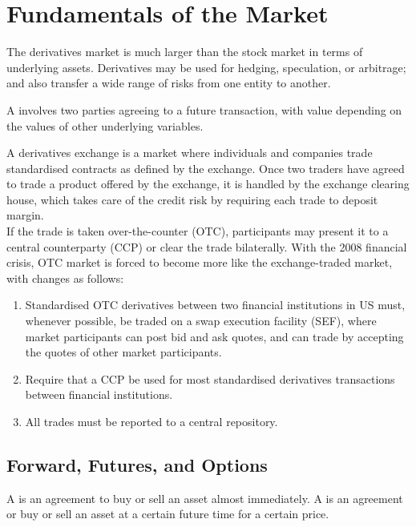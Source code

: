 \section{Fundamentals of the Market}

The derivatives market is much larger than the stock market in terms of underlying assets. Derivatives may be used for hedging, speculation, or arbitrage; and also transfer a wide range of risks from one entity to another.

\begin{definition} A  involves two parties agreeing to a future transaction, with value depending on the values of other underlying variables.
\end{definition}

A derivatives exchange is a market where individuals and companies trade standardised contracts as defined by the exchange. Once two traders have agreed to trade a product offered by the exchange, it is handled by the exchange clearing house, which takes care of the credit risk by requiring each trade to deposit margin.\\

If the trade is taken over-the-counter (OTC), participants may present it to a central counterparty (CCP) or clear the trade bilaterally. With the 2008 financial crisis, OTC market is forced to become more like the exchange-traded market, with changes as follows:
\begin{enumerate}[label=\roman*.]
\setlength{\itemsep}{0pt}
\item Standardised OTC derivatives between two financial institutions in US must, whenever possible, be traded on a swap execution facility (SEF), where market participants can post bid and ask quotes, and can trade by accepting the quotes of other market participants.
\item Require that a CCP be used for most standardised derivatives transactions between financial institutions.
\item All trades must be reported to a central repository.
\end{enumerate}

\subsection{Forward, Futures, and Options}

\begin{definition} A  is an agreement to buy or sell an asset almost immediately. A  is an agreement or buy or sell an asset at a certain future time for a certain price.
\end{definition}


